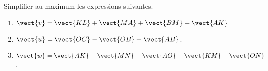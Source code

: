 
\begin{exercice}\label{exosmath-0067}

Simplifier au maximum les expressions suivantes.
\begin{enumerate}
    \item
        \( \vect{ v }=\vect{ KL }+\vect{ MA }+\vect{ BM }+\vect{ AK }\)
    \item
        \( \vect{ u }=\vect{ OC }-\vect{ OB }+\vect{ AB }\).
    \item
        \( \vect{ w }=\vect{ AK }+\vect{ MN }-\vect{ AO }+\vect{ KM }-\vect{ ON }\).
\end{enumerate}

\end{exercice}
